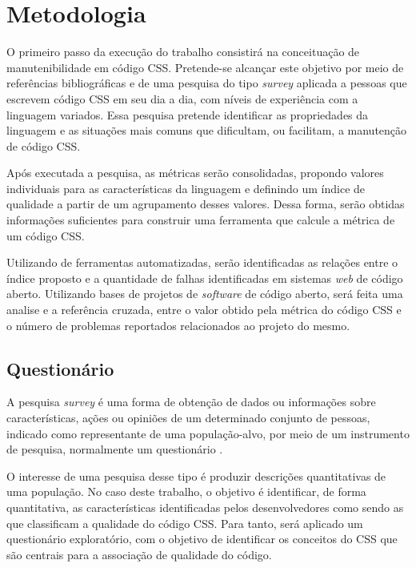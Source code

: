 %
%

\chapter{Metodologia}

O primeiro passo da execução do trabalho consistirá na conceituação de manutenibilidade em código CSS. Pretende-se alcançar este objetivo por meio de referências bibliográficas e de uma pesquisa do tipo \textit{survey} aplicada a pessoas que escrevem código CSS em seu dia a dia, com níveis de experiência com a linguagem variados. Essa pesquisa pretende identificar as propriedades da linguagem e as situações mais comuns que dificultam, ou facilitam, a manutenção de código CSS.

Após executada a pesquisa, as métricas serão consolidadas, propondo valores individuais para as características da linguagem e definindo um índice de qualidade a partir de um agrupamento desses valores. Dessa forma, serão obtidas informações suficientes para construir uma ferramenta que calcule a métrica de um código CSS.

Utilizando de ferramentas automatizadas, serão identificadas as relações entre o índice proposto e a quantidade de falhas identificadas em sistemas \textit{web} de código aberto. Utilizando bases de projetos de \textit{software} de código aberto, será feita uma analise e a referência cruzada, entre o valor obtido pela métrica do código CSS e o número de problemas reportados relacionados ao projeto do mesmo.

\section{Questionário}

A pesquisa \textit{survey} é uma forma de obtenção de dados ou informações sobre características, ações ou opiniões de um determinado conjunto de pessoas, indicado como representante de uma população-alvo, por meio de um instrumento de pesquisa, normalmente um questionário \cite{Freitas2000}. 

O interesse de uma pesquisa desse tipo é produzir descrições quantitativas de uma população. No caso deste trabalho, o objetivo é identificar, de forma quantitativa, as características identificadas pelos desenvolvedores como sendo as que classificam a qualidade do código CSS. Para tanto, será aplicado um questionário exploratório, com o objetivo de identificar os conceitos do CSS que são centrais para a associação de qualidade do código.

